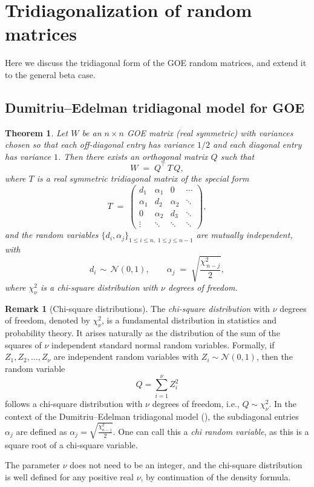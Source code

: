 \documentclass[letterpaper,11pt,oneside,reqno]{article}
\numberwithin{equation}{section}
\newtheorem{theorem}[proposition]{Theorem}
\theoremstyle{definition}
\newtheorem{remark}[proposition]{Remark}
\begin{document}
\section{Tridiagonalization of random matrices}
\label{sec:Wigner-SC-detailed}

Here we discuss the tridiagonal form of the GOE random matrices,
and extend it to the general beta case.

\subsection{Dumitriu–Edelman tridiagonal model for GOE}

\begin{theorem}
\label{thm:DE-model}
Let \(W\) be an \(n\times n\) GOE matrix (real symmetric) with variances chosen so that each off-diagonal entry has variance \(1/2\) and each diagonal entry has variance \(1\).  Then there exists an orthogonal matrix \(Q\) such that
\[
   W \;=\; Q^\top\,T\,Q,
\]
where \(T\) is a real symmetric tridiagonal matrix of the special form
\[
   T \;=\; \begin{pmatrix}
         d_1 & \alpha_1 & 0 & \cdots \\
         \alpha_1 & d_2 & \alpha_2 & \ddots \\
         0 & \alpha_2 & d_3 & \ddots \\
         \vdots & \ddots & \ddots & \ddots
       \end{pmatrix},
\]
and the random variables \(\{d_i,\alpha_j\}_{1 \le i \le n,\;1\le j\le n-1}\) are mutually independent, with
\[
  d_i \,\sim\, \mathcal{N}(0,1),
  \qquad
  \alpha_j \;=\; \sqrt{\frac{\chi^2_{\,n-j}}{2}},
\]
where \(\chi^2_{\nu}\) is a chi-square distribution with \(\nu\) degrees of freedom.
\end{theorem}

\begin{remark}[Chi-square distributions]
The \emph{chi-square distribution} with \(\nu\) degrees of
freedom, denoted by \(\chi^2_{\nu}\), is a fundamental
distribution in statistics and probability theory. It arises
naturally as the distribution of the sum of the squares of
\(\nu\) independent standard normal random variables.
Formally, if \(Z_1, Z_2, \ldots, Z_{\nu}\) are independent
random variables with \(Z_i \sim \mathcal{N}(0,1)\), then
the random variable
\[
  Q = \sum_{i=1}^{\nu} Z_i^2
\]
follows a chi-square distribution with \(\nu\) degrees of
freedom, i.e., \(Q \sim \chi^2_{\nu}\). In the context of
the Dumitriu–Edelman tridiagonal model
(), the subdiagonal entries \(\alpha_j\)
are defined as \(\alpha_j = \sqrt{\frac{\chi^2_{n-j}}{2}}\).
One can call this a \emph{chi random variable},
as this is a square root of a chi-square variable.

The parameter $\nu$ does not need to be an integer, and the
chi-square distribution is well defined for any positive
real $\nu$, by continuation of the density formula.
\end{remark}
\end{document}
